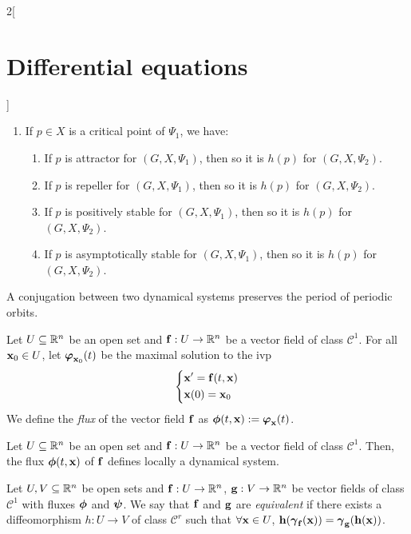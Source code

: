 \documentclass[../../../main.tex]{subfiles}
\begin{document}
\begin{multicols}{2}[\section{Differential equations}]
\begin{prop}
\begin{enumerate}
\begin{enumerate}
                  \end{enumerate}
            \item If $p\in X$ is a critical point of $\Psi_1$, we have:
                  \begin{enumerate}
                      \item If $p$ is attractor for $(G,X,\Psi_1)$, then so it is $h(p)$ for $(G,X,\Psi_2)$.
                      \item If $p$ is repeller for $(G,X,\Psi_1)$, then so it is $h(p)$ for $(G,X,\Psi_2)$.
                      \item If $p$ is positively stable for $(G,X,\Psi_1)$, then so it is $h(p)$ for $(G,X,\Psi_2)$.
                      \item If $p$ is asymptotically stable for $(G,X,\Psi_1)$, then so it is $h(p)$ for $(G,X,\Psi_2)$.
                  \end{enumerate}
        \end{enumerate}
    \end{prop}
    \begin{prop}
        A conjugation between two dynamical systems preserves the period of periodic orbits.
    \end{prop}
    \begin{definition}
        Let $U\subseteq \mathbb{R}^n$ be an open set and $\boldsymbol{\mathrm{f}}:U\rightarrow\mathbb{R}^n$ be a vector field of class $\mathcal{C}^1$. For all $\boldsymbol{\mathrm{x}}_0\in U$, let $\boldsymbol{\mathrm{\varphi}}_{\boldsymbol{\mathrm{x}}_0}(t)$ be the maximal solution to the ivp
        $$\left\{
            \begin{aligned}
                 & \boldsymbol{\mathrm{x}}'      =\boldsymbol{\mathrm{f}}(t,\boldsymbol{\mathrm{x}}) \\
                 & \boldsymbol{\mathrm{x}}(0)  =\boldsymbol{\mathrm{x}}_0
            \end{aligned}
            \right.$$
        We define the \textit{flux} of the vector field $\boldsymbol{\mathrm{f}}$ as $\boldsymbol{\mathrm{\phi}}(t,\boldsymbol{\mathrm{x}}):=\boldsymbol{\mathrm{\varphi}}_{\boldsymbol{\mathrm{x}}}(t)$.
    \end{definition}
    \begin{prop}
        Let $U\subseteq \mathbb{R}^n$ be an open set and $\boldsymbol{\mathrm{f}}:U\rightarrow\mathbb{R}^n$ be a vector field of class $\mathcal{C}^1$. Then, the flux $\boldsymbol{\mathrm{\phi}}(t,\boldsymbol{\mathrm{x}})$ of $\boldsymbol{\mathrm{f}}$ defines locally a dynamical system.
    \end{prop}
    \begin{definition}
        Let $U,V\subseteq \mathbb{R}^n$ be open sets and $\boldsymbol{\mathrm{f}}:U\rightarrow\mathbb{R}^n$, $\boldsymbol{\mathrm{g}}:V\rightarrow\mathbb{R}^n$ be vector fields of class $\mathcal{C}^1$ with fluxes $\boldsymbol{\mathrm{\phi}}$ and $\boldsymbol{\mathrm{\psi}}$. We say that $\boldsymbol{\mathrm{f}}$ and $\boldsymbol{\mathrm{g}}$ are \textit{equivalent} if there exists a diffeomorphism $h:U\rightarrow V$ of class $\mathcal{C}^r$ such that $\forall \boldsymbol{\mathrm{x}}\in U$, $\boldsymbol{\mathrm{h}}(\boldsymbol{\mathrm{\gamma}}_{\boldsymbol{\mathrm{f}}}(\boldsymbol{\mathrm{x}}))=\boldsymbol{\mathrm{\gamma}}_{\boldsymbol{\mathrm{g}}}(\boldsymbol{\mathrm{h}}(\boldsymbol{\mathrm{x}}))$.

\end{definition}
\end{multicols}
\end{document}
